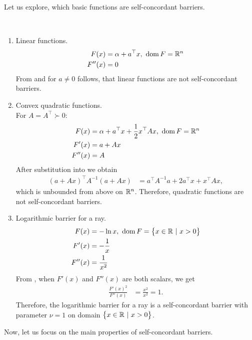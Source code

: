 Let us explore, which basic functions are self-concordant barriers.

\begin{example}~
  \begin{enumerate}
    \item Linear functions.
      \begin{align}
        F(x) &= \alpha + a^\top x,\ \operatorname{dom} F = \mathbb{R}^n\\
        F''(x) &= 0
      \end{align}
      From  and for $a \neq 0$ follows, that linear functions are not self-concordant barriers.

    \item Convex quadratic functions.\\
      For $A = A^\top \succ 0$:
      \begin{align}
        F(x) &= \alpha + a^\top x + \frac{1}{2} x^\top Ax,\ \operatorname{dom} F = \mathbb{R}^n\\
        F'(x) &= a + Ax\\
        F''(x) &= A
      \end{align}
      After substitution into  we obtain
      \begin{align}
        (a + Ax)^\top A^{-1}(a + Ax) &= a^\top A^{-1}a + 2a^\top x + x^\top Ax,
      \end{align}
      which is unbounded from above on $\mathbb{R}^n$. Therefore, quadratic functions are not self-concordant barriers.
      

    \item Logarithmic barrier for a ray.
      \begin{align}
        F(x) &= -\ln x,\ \operatorname{dom} F = \big\{x\in\mathbb{R}\ |\ x > 0\big\}\\
        F'(x) &= -\frac{1}{x}\\
        F''(x) &= \frac{1}{x^2}
      \end{align}
      From , when $F'(x)$ and $F''(x)$ are both scalars, we get
      \begin{align}
        \frac{F'(x)^2}{F''(x)} &= \frac{x^2}{x^2} = 1.
      \end{align}
      Therefore, the logarithmic barrier for a ray is a self-concordant barrier with parameter $\nu = 1$ on domain $\big\{x\in\mathbb{R}\ |\ x > 0\big\}$.
  \end{enumerate}
\end{example}

Now, let us focus on the main properties of self-concordant barriers.


